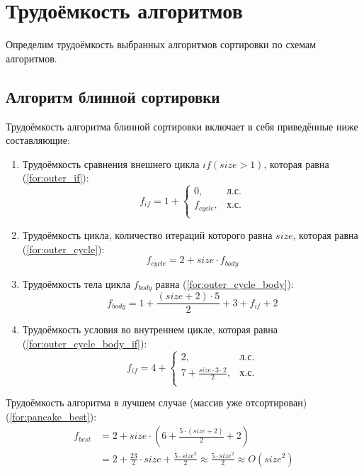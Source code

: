 \section{Трудоёмкость алгоритмов}

Определим трудоёмкость выбранных алгоритмов сортировки по схемам алгоритмов.

\subsection{Алгоритм блинной сортировки}

Трудоёмкость алгоритма блинной сортировки включает в себя приведённые ниже составляющие:
\begin{enumerate}
	\item Трудоёмкость сравнения внешнего цикла $if  (size > 1)$, которая равна (\ref{for:outer_if}):
	\begin{equation}
		\label{for:outer_if}
		f_{if} =1 + \begin{cases}
			0, & \text{л.с.}\\
			f_{cycle}, & \text{х.с.}\\
		\end{cases}
	\end{equation}
	\item Трудоёмкость цикла, количество итераций которого равна  $size$, которая равна (\ref{for:outer_cycle}):
	\begin{equation}
		\label{for:outer_cycle}
		f_{cycle} = 2 + size \cdot f_{body}
	\end{equation}
	\item Трудоёмкость тела цикла $f_{body}$ равна (\ref{for:outer_cycle_body}):
	\begin{equation}
		\label{for:outer_cycle_body}
		f_{body} = 1 + \frac{(size + 2) \cdot 5}{2} + 3 + f_{if} + 2
	\end{equation}
	\item Трудоёмкость условия во внутреннем цикле, которая равна (\ref{for:outer_cycle_body_if}):
	\begin{equation}
		\label{for:outer_cycle_body_if}
		f_{if} = 4 + \begin{cases}
			2, & \text{л.с.}\\
			7 + \frac{size \cdot 3 \cdot 2}{2} , & \text{х.с.}\\
		\end{cases}
	\end{equation}
\end{enumerate}

Трудоёмкость алгоритма в лучшем случае (массив уже отсортирован)(\ref{for:pancake_best}):
\begin{align}
	\label{for:pancake_best}
	f_{best} &= 2 + size \cdot (6 + \frac{5 \cdot (size + 2)}{2} + 2)  \\
	&= 2 + \frac{23}{2} \cdot size + \frac{5\cdot size^2}{2} \approx \frac{5\cdot size^2}{2} \approx O(size^2)
\end{align}

